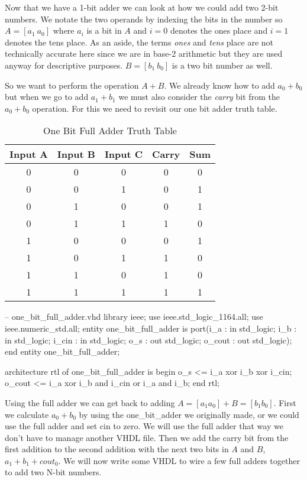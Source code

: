 Now that we have a 1-bit adder we can look at how we could add two 2-bit numbers. We notate the two operands by indexing the bits in the number so $A=[a_1~a_0]$ where $a_i$ is a bit in $A$ and $i=0$ denotes the ones place and $i=1$ denotes the tens place. As an aside, the terms \emph{ones} and \emph{tens} place are not technically accurate here since we are in base-2 arithmetic but they are used anyway for descriptive purposes. $B=[b_1~b_0]$ is a two bit number as well.

So we want to perform the operation $A+B$. We already know how to add $a_0+b_0$ but when we go to add $a_1+b_1$ we must also consider the \emph{carry} bit from the $a_0+b_0$ operation. For this we need to revisit our one bit adder truth table.

\begin{table}[h!]  
\begin{center}    
\caption{One Bit Full Adder Truth Table} 
\label{tab:tt2bfa} 
\begin{tabular}{|c|c|c||c|c|}  
\textbf{Input A} & \textbf{Input B} & \textbf{Input C} & \textbf{Carry} & \textbf{Sum}\\  
\hline  
0 & 0 & 0 & 0 & 0\\  
0 & 0 & 1 & 0 & 1\\  
0 & 1 & 0 & 0 & 1\\  
0 & 1 & 1 & 1 & 0\\  
1 & 0 & 0 & 0 & 1\\  
1 & 0 & 1 & 1 & 0\\  
1 & 1 & 0 & 1 & 0\\  
1 & 1 & 1 & 1 & 1\\ 
\end{tabular}  
\end{center}
\end{table}

\begin{VHDLlisting}[tabsize=4]
-- one_bit_full_adder.vhd
library ieee; 
	use ieee.std_logic_1164.all; 
	use ieee.numeric_std.all; 
entity one_bit_full_adder is
port(i_a    : in    std_logic;  
	 i_b    : in    std_logic;  
	 i_cin  : in    std_logic;  
	 o_s    :   out std_logic;  
	 o_cout :   out std_logic);
end entity one_bit_full_adder;

architecture rtl of one_bit_full_adder is
begin 
	o_s <= i_a xor i_b xor i_cin; 
	o_cout <= i_a xor i_b and i_cin or i_a and i_b;
end rtl;
\end{VHDLlisting}

Using the full adder we can get back to adding $A=[a_1 a_0] + B=[b_1 b_0]$. First we calculate $a_0 + b_0$ by using the one\_bit\_adder we originally made, or we could use the full adder and set cin to zero. We will use the full adder that way we don't have to manage another \ac{VHDL} file. Then we add the carry bit from the first addition to the second addition with the next two bits in $A$ and $B$, $a_1 + b_1 + cout_0$. We will now write some \ac{VHDL} to wire a few full adders together to add two N-bit numbers.  

